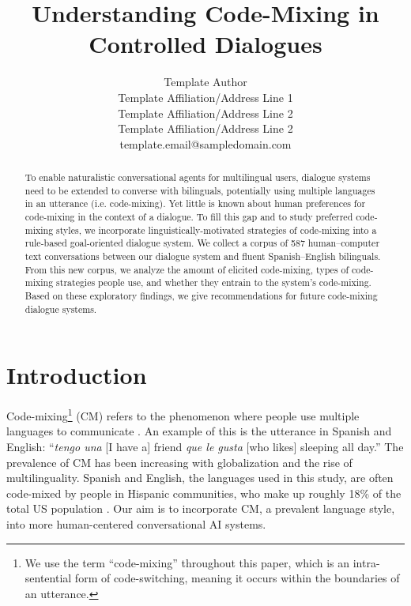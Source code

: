 \documentclass[11pt,a4paper]{article}
\title{Understanding Code-Mixing in Controlled Dialogues}
\author{
 Template Author\Thanks{The {\em actual} contributors to this instruction
 document and corresponding template file are given in Section
 \ref{sec:contributors}.} \\
 Template Affiliation/Address Line 1 \\
 Template Affiliation/Address Line 2 \\
 Template Affiliation/Address Line 2 \\
  {\sf template.email@sampledomain.com} \\
}
\date{}
\newcommand{\yt}[1]{\textcolor{cyan}{\bf\small [#1 --YT]}}
\newcommand{\red}[1]{\textcolor{red}{#1}}
\begin{document}
\maketitle
\begin{abstract}
To enable naturalistic conversational agents for multilingual users, dialogue systems need to be extended to converse with bilinguals, potentially using multiple languages in an utterance (i.e. code-mixing). 
Yet little is known about human preferences for code-mixing in the context of a dialogue. 
To fill this gap and to study preferred code-mixing styles, we incorporate linguistically-motivated strategies of code-mixing into a rule-based goal-oriented dialogue system.
We collect a corpus of 587 human--computer text conversations between our dialogue system and fluent Spanish--English bilinguals.
From this new corpus, we analyze the amount of elicited code-mixing, types of code-mixing strategies people use, and whether they entrain to the system's code-mixing. 
Based on these exploratory findings, we give recommendations for future code-mixing dialogue systems.


\end{abstract}

\section{Introduction}

Code-mixing\footnote{We use the term ``code-mixing'' throughout this paper, which is an intra-sentential form of code-switching, meaning it occurs within the boundaries of an utterance.} (CM) refers to the phenomenon where people use multiple languages to communicate \citep{sankoff1981formal}.
An example of this is the utterance in Spanish and English: ``\textit{tengo una} [I have a] friend \textit{que le gusta} [who likes] sleeping all day.''
The prevalence of CM has been increasing with globalization and the rise of multilinguality.
Spanish and English, the languages used in this study, are often code-mixed by people in Hispanic communities, who make up roughly 18\% of the total US population \citep{census2017}.
Our aim is to incorporate CM, a prevalent language style, into more human-centered conversational AI systems.
\end{document}
